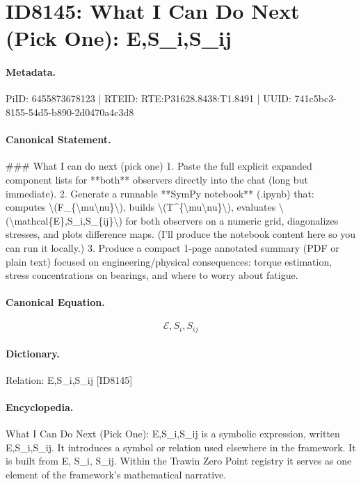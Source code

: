 \section*{ID8145: What I Can Do Next (Pick One): E,S\_i,S\_ij}
\paragraph{Metadata.}
PiID: 6455873678123 | RTEID: RTE:P31628.8438:T1.8491 | UUID: 741c5bc3-8155-54d5-b890-2d0470a4c3d8

\paragraph{Canonical Statement.}
\#\#\# What I can do next (pick one) 1. Paste the full explicit expanded component lists for **both** observers directly into the chat (long but immediate). 2. Generate a runnable **SymPy notebook** (.ipynb) that: computes \textbackslash{}(F\_\{\textbackslash{}mu\textbackslash{}nu\}\textbackslash{}), builds \textbackslash{}(T\textasciicircum{}\{\textbackslash{}mu\textbackslash{}nu\}\textbackslash{}), evaluates \textbackslash{}(\textbackslash{}mathcal\{E\},S\_i,S\_\{ij\}\textbackslash{}) for both observers on a numeric grid, diagonalizes stresses, and plots difference maps. (I’ll produce the notebook content here so you can run it locally.) 3. Produce a compact 1-page annotated summary (PDF or plain text) focused on engineering/physical consequences: torque estimation, stress concentrations on bearings, and where to worry about fatigue.

\paragraph{Canonical Equation.}
\[
\mathcal{E},S_i,S_{ij}
\]

\paragraph{Dictionary.}
Relation: E,S\_i,S\_ij [ID8145]

\paragraph{Encyclopedia.}
What I Can Do Next (Pick One): E,S\_i,S\_ij is a symbolic expression, written E,S\_i,S\_ij. It introduces a symbol or relation used elsewhere in the framework. It is built from E, S\_i, S\_ij. Within the Trawin Zero Point registry it serves as one element of the framework's mathematical narrative.
